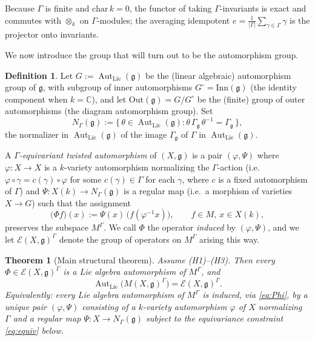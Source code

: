 \documentclass{amsart}
\newtheorem{theorem}{Theorem}
\theoremstyle{definition}
\newtheorem{definition}{Definition}
\DeclareMathOperator{\Aut}{Aut}
\newcommand{\g}{\mathfrak{g}}
\newcommand{\C}{\mathbb{C}}
\newcommand{\M}{M}
\begin{document}
Because $\Gamma$ is finite and $\mathrm{char}\,k=0$, the functor of taking
$\Gamma$-invariants is exact and commutes with $\otimes_k$ on
$\Gamma$-modules; the averaging idempotent
$e=\frac1{|\Gamma|}\sum_{\gamma\in\Gamma}\gamma$ is the projector onto
invariants.

\medskip
We now introduce the group that will turn out to be the automorphism
group.

\begin{definition}\label{def:emap}
Let $G:=\Aut_{\mathrm{Lie}}(\g)$ be the (linear algebraic) automorphism
group of $\g$, with subgroup of inner automorphisms $G^\circ=\mathrm{Inn}(\g)$
(the identity component when $k=\C$), and let
$\mathrm{Out}(\g)=G/G^\circ$ be the (finite) group of outer
automorphisms (the diagram automorphism group).  Set
\[
N_\Gamma(\g):=\{\,\theta\in\Aut_{\mathrm{Lie}}(\g):
\theta\,\Gamma_\g\,\theta^{-1}=\Gamma_\g\,\},
\]
the normalizer in $\Aut_{\mathrm{Lie}}(\g)$ of the image $\Gamma_\g$ of
$\Gamma$ in $\Aut_{\mathrm{Lie}}(\g)$.

A \emph{$\Gamma$-equivariant twisted automorphism} of $(X,\g)$ is a pair
$(\varphi,\Psi)$ where $\varphi\colon X\to X$ is a $k$-variety
automorphism normalizing the $\Gamma$-action (i.e.\ $\varphi\circ\gamma=
c(\gamma)\circ\varphi$ for some $c(\gamma)\in\Gamma$ for each
$\gamma$, where $c$ is a fixed automorphism of $\Gamma$) and
$\Psi\colon X(k)\to N_\Gamma(\g)$ is a regular map (i.e.\ a morphism of
varieties $X\to G$) such that the assignment
\begin{equation}\label{eq:Phi}
\bigl(\Phi f\bigr)(x):=\Psi(x)\,\bigl(f(\varphi^{-1}x)\bigr),
\qquad f\in\M,\ x\in X(k),
\end{equation}
preserves the subspace $\M^\Gamma$.  We call $\Phi$ the operator
\emph{induced} by $(\varphi,\Psi)$, and we let $\mathcal{E}(X,\g)^\Gamma$
denote the group of operators on $\M^\Gamma$ arising this way.
\end{definition}

\begin{theorem}[Main structural theorem]\label{thm:main}
Assume \textnormal{(H1)--(H3)}.  Then every $\Phi\in\mathcal{E}(X,\g)^\Gamma$
is a Lie algebra automorphism of $\M^\Gamma$, and
\[
\Aut_{\mathrm{Lie}}\bigl(\M(X,\g)^\Gamma\bigr)
=\mathcal{E}(X,\g)^\Gamma .
\]
Equivalently: every Lie algebra automorphism of $\M^\Gamma$ is induced,
via \eqref{eq:Phi}, by a unique pair $(\varphi,\Psi)$ consisting of a
$k$-variety automorphism $\varphi$ of $X$ normalizing $\Gamma$ and a
regular map $\Psi\colon X\to N_\Gamma(\g)$ subject to the equivariance
constraint \eqref{eq:equiv} below.
\end{theorem}
\end{document}
